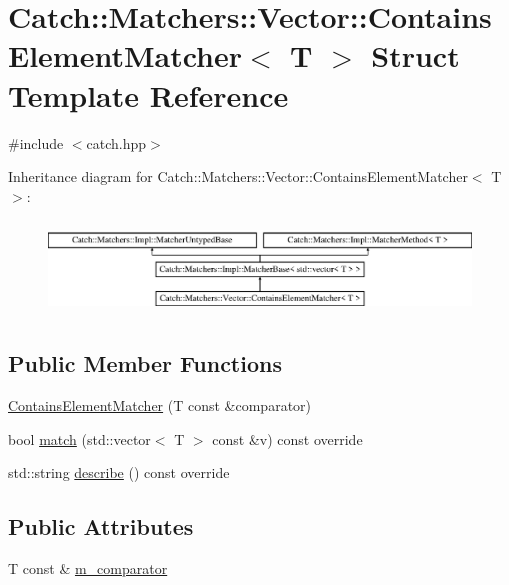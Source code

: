 \hypertarget{struct_catch_1_1_matchers_1_1_vector_1_1_contains_element_matcher}{}\section{Catch\+:\+:Matchers\+:\+:Vector\+:\+:Contains\+Element\+Matcher$<$ T $>$ Struct Template Reference}
\label{struct_catch_1_1_matchers_1_1_vector_1_1_contains_element_matcher}


{\ttfamily \#include $<$catch.\+hpp$>$}

Inheritance diagram for Catch\+:\+:Matchers\+:\+:Vector\+:\+:Contains\+Element\+Matcher$<$ T $>$\+:\begin{figure}[H]
\begin{center}
\leavevmode
\includegraphics[height=2.514970cm]{struct_catch_1_1_matchers_1_1_vector_1_1_contains_element_matcher}
\end{center}
\end{figure}
\subsection*{Public Member Functions}
\begin{DoxyCompactItemize}
\item 
\mbox{\hyperlink{struct_catch_1_1_matchers_1_1_vector_1_1_contains_element_matcher_a6a05740b5d3f89fac8de84ac0cff7b93}{Contains\+Element\+Matcher}} (T const \&comparator)
\item 
bool \mbox{\hyperlink{struct_catch_1_1_matchers_1_1_vector_1_1_contains_element_matcher_a6a4be6e5642e267433d370649beb0fac}{match}} (std\+::vector$<$ T $>$ const \&v) const override
\item 
std\+::string \mbox{\hyperlink{struct_catch_1_1_matchers_1_1_vector_1_1_contains_element_matcher_aea3b674389a0afd82af6ba4b10f86ae6}{describe}} () const override
\end{DoxyCompactItemize}
\subsection*{Public Attributes}
\begin{DoxyCompactItemize}
\item 
T const  \& \mbox{\hyperlink{struct_catch_1_1_matchers_1_1_vector_1_1_contains_element_matcher_ab7eada6c4bbce1d21b44773262f9cb23}{m\+\_\+comparator}}
\end{DoxyCompactItemize}
